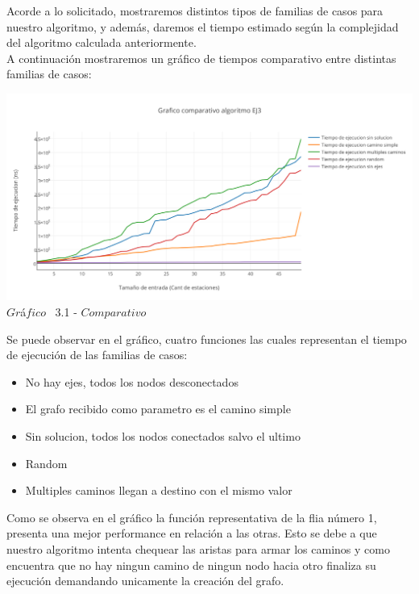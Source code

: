 \indent Acorde a lo solicitado, mostraremos distintos tipos de familias de casos para nuestro algoritmo, y adem\'as, daremos el tiempo estimado 
seg\'un la complejidad del algoritmo calculada anteriormente.\\

A continuaci\'on mostraremos un gr\'afico de tiempos comparativo entre distintas familias de casos:\\ 

\vspace*{0.3cm} \vspace*{0.3cm}
  \begin{center}
 \includegraphics[scale=0.65]{./EJ3/comparativo.png}
 {$Gr$\'a$fico$ \ 3.1 - $Comparativo$}
  \end{center}
  \vspace*{0.3cm}
  
Se puede observar en el gr\'afico, cuatro funciones las cuales representan el tiempo de ejecuci\'on de las familias de casos:\\
\begin{itemize}
\item No hay ejes, todos los nodos desconectados
\item El grafo recibido como parametro es el camino simple
\item Sin solucion, todos los nodos conectados salvo el ultimo
\item Random
\item Multiples caminos llegan a destino con el mismo valor
\end{itemize}

Como se observa en el gr\'afico la funci\'on representativa de la flia n\'umero 1, presenta una mejor performance en relaci\'on a las otras. Esto se debe a que nuestro algoritmo intenta chequear las aristas para armar los caminos y como encuentra que no hay ningun camino de ningun nodo hacia otro finaliza su ejecuci\'on demandando unicamente la creaci\'on del grafo.

